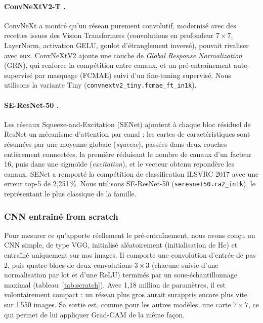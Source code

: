 \paragraph{ConvNeXtV2-T \cite{woo2023convnextv2}.} ConvNeXt \cite{liu2022convnet} a montré qu'un réseau purement convolutif, modernisé avec des recettes issues des Vision Transformers (convolutions en profondeur $7\times7$, LayerNorm, activation GELU, goulot d'étranglement inversé), pouvait rivaliser avec eux. ConvNeXtV2 ajoute une couche de \emph{Global Response Normalization} (GRN), qui renforce la compétition entre canaux, et un pré-entraînement auto-supervisé par masquage (FCMAE) suivi d'un fine-tuning supervisé. Nous utilisons la variante Tiny (\texttt{convnextv2\_tiny.fcmae\_ft\_in1k}).

\paragraph{SE-ResNet-50 \cite{hu2018squeeze}.} Les réseaux Squeeze-and-Excitation (SENet) ajoutent à chaque bloc résiduel de ResNet \cite{he2016deep} un mécanisme d'attention par canal : les cartes de caractéristiques sont résumées par une moyenne globale (\emph{squeeze}), passées dans deux couches entièrement connectées, la première réduisant le nombre de canaux d'un facteur 16, puis dans une sigmoïde (\emph{excitation}), et le vecteur obtenu repondère les canaux. SENet a remporté la compétition de classification ILSVRC 2017 avec une erreur top-5 de 2,251\,\%. Nous utilisons SE-ResNet-50 (\texttt{seresnet50.ra2\_in1k}), le représentant le plus classique de la famille.

\subsubsection{CNN entraîné from scratch}

Pour mesurer ce qu'apporte réellement le pré-entraînement, nous avons conçu un CNN simple, de type VGG, initialisé aléatoirement (initialisation de He) et entraîné uniquement sur nos images. Il comporte une convolution d'entrée de pas 2, puis quatre blocs de deux convolutions $3\times3$ (chacune suivie d'une normalisation par lot et d'une ReLU) terminés par un sous-échantillonnage maximal (tableau~\ref{tab:scratch}). Avec 1,18 million de paramètres, il est volontairement compact : un réseau plus gros aurait surappris encore plus vite sur 1\,550 images. Sa sortie est, comme pour les autres modèles, une carte $7\times7$, ce qui permet de lui appliquer Grad-CAM de la même façon.

